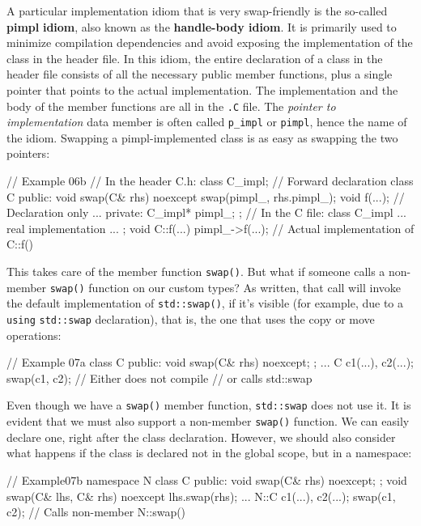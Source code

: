 A particular implementation idiom that is very swap-friendly is the so-called \textbf{pimpl} \textbf{idiom}, also known as the \textbf{handle-body idiom}. It is primarily used to minimize compilation dependencies and avoid exposing the implementation of the class in the header file. In this idiom, the entire declaration of a class in the header file consists of all the necessary public member functions, plus a single pointer that points to the actual implementation. The implementation and the body of the member functions are all in the \texttt{.C} file. The \emph{pointer to implementation} data member is often called \texttt{p\_impl} or \texttt{pimpl}, hence the name of the idiom. Swapping a pimpl-implemented class is as easy as swapping the two pointers:

\begin{code}
// Example 06b
// In the header C.h:
class C_impl;        // Forward declaration
class C {
  public:
  void swap(C& rhs) noexcept {
    swap(pimpl_, rhs.pimpl_);
  }
  void f(...);        // Declaration only
  ...
  private:
  C_impl* pimpl_;
};
// In the C file:
class C_impl {
  ... real implementation ...
};
void C::f(...) {
  pimpl_->f(...);    // Actual implementation of C::f()
}
\end{code}

This takes care of the member function \texttt{swap()}. But what if someone calls a non-member \texttt{swap()} function on our custom types? As written, that call will invoke the default implementation of \texttt{std::swap()}, if it's visible (for example, due to a \texttt{using} \texttt{std::swap} declaration), that is, the one that uses the copy or move operations:

\begin{code}
// Example 07a
class C {
  public:
  void swap(C& rhs) noexcept;
};
...
C c1(...), c2(...);
swap(c1, c2);    // Either does not compile
             // or calls std::swap
\end{code}

Even though we have a \texttt{swap()} member function, \texttt{std::swap} does not use it. It is evident that we must also support a non-member \texttt{swap()} function. We can easily declare one, right after the class declaration. However, we should also consider what happens if the class is declared not in the global scope, but in a namespace:

\begin{code}
// Example07b
namespace N {
  class C {
    public:
    void swap(C& rhs) noexcept;
  };
  void swap(C& lhs, C& rhs) noexcept { lhs.swap(rhs); }
}
...
N::C c1(...), c2(...);
swap(c1, c2);    // Calls non-member N::swap()
\end{code}

